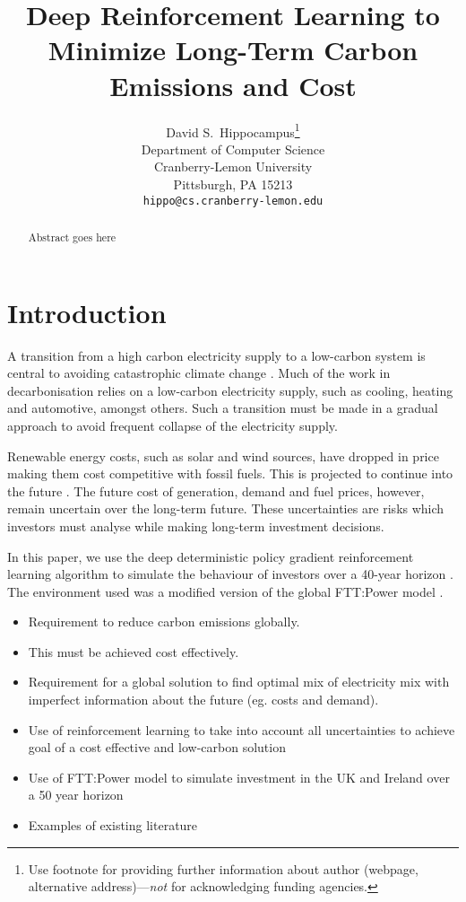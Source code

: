 \documentclass{article}
\title{Deep Reinforcement Learning to Minimize Long-Term Carbon Emissions and Cost}
\author{%
  David S.~Hippocampus\thanks{Use footnote for providing further information
    about author (webpage, alternative address)---\emph{not} for acknowledging
    funding agencies.} \\
  Department of Computer Science\\
  Cranberry-Lemon University\\
  Pittsburgh, PA 15213 \\
  \texttt{hippo@cs.cranberry-lemon.edu} \\
}
\begin{document}
\maketitle

\begin{abstract}
Abstract goes here
\end{abstract}




\section{Introduction}
\label{sec:intro}


A transition from a high carbon electricity supply to a low-carbon system is central to avoiding catastrophic climate change \cite{Kell2020}. Much of the work in decarbonisation relies on a low-carbon electricity supply, such as cooling, heating and automotive, amongst others. Such a transition must be made in a gradual approach to avoid frequent collapse of the electricity supply.

Renewable energy costs, such as solar and wind sources, have dropped in price making them cost competitive with fossil fuels. This is projected to continue into the future \cite{IEA2015}. The future cost of generation, demand and fuel prices, however, remain uncertain over the long-term future. These uncertainties are risks which investors must analyse while making long-term investment decisions.

In this paper, we use the deep deterministic policy gradient reinforcement learning algorithm to simulate the behaviour of investors over a 40-year horizon \cite{Hunt2016a}. The environment used was a modified version of the global FTT:Power model \cite{Mercure2012}.

\begin{itemize}
	\item Requirement to reduce carbon emissions globally.
	\item This must be achieved cost effectively.
	\item Requirement for a global solution to find optimal mix of electricity mix with imperfect information about the future (eg. costs and demand).
	\item Use of reinforcement learning to take into account all uncertainties to achieve goal of a cost effective and low-carbon solution
	\item Use of FTT:Power model to simulate investment in the UK and Ireland over a 50 year horizon
	\item Examples of existing literature
\end{itemize}
\end{document}
